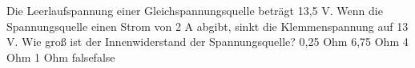     {Die Leerlaufspannung einer Gleichspannungsquelle beträgt 13,5 V. Wenn die Spannungsquelle einen Strom von 2 A abgibt, sinkt die Klemmenspannung auf 13 V. Wie groß ist der Innenwiderstand der Spannungsquelle?}
    {0,25 Ohm}
    {6,75 Ohm}
    {4 Ohm}
    {1 Ohm}
    {false}{false}